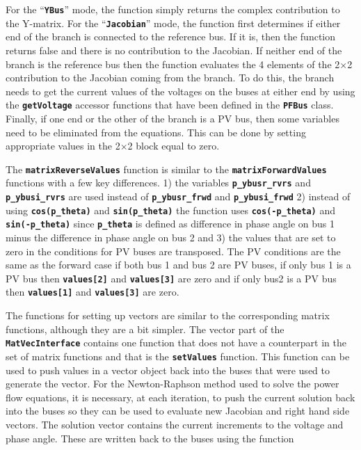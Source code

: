 For the ``\texttt{\textbf{YBus}}'' mode, the function simply returns the complex contribution to the Y-matrix. For the ``\texttt{\textbf{Jacobian}}'' mode, the function first determines if either end of the branch is connected to the reference bus. If it is, then the function returns false and there is no contribution to the Jacobian. If neither end of the branch is the reference bus then the function evaluates the 4 elements of the 2$\mathrm{\times}$2 contribution to the Jacobian coming from the branch. To do this, the branch needs to get the current values of the voltages on the buses at either end by using the \texttt{\textbf{getVoltage}} accessor functions that have been defined in the \texttt{\textbf{PFBus}} class. Finally, if one end or the other of the branch is a PV bus, then some variables need to be eliminated from the equations. This can be done by setting appropriate values in the 2$\mathrm{\times}$2 block equal to zero.

The \texttt{\textbf{matrixReverseValues}} function is similar to the \texttt{\textbf{matrixForwardValues}} functions with a few key differences. 1) the variables \texttt{\textbf{p\_ybusr\_rvrs}} and \texttt{\textbf{p\_ybusi\_rvrs}} are used instead of \texttt{\textbf{p\_ybusr\_frwd}} and \texttt{\textbf{p\_ybusi\_frwd}} 2) instead of using \texttt{\textbf{cos(p\_theta)}} and \texttt{\textbf{sin(p\_theta)}} the function uses \texttt{\textbf{cos(-p\_theta)}} and \texttt{\textbf{sin(-p\_theta)}} since \texttt{\textbf{p\_theta}} is defined as difference in phase angle on bus 1 minus the difference in phase angle on bus 2 and 3) the values that are set to zero in the conditions for PV buses are transposed. The PV conditions are the same as the forward case if both bus 1 and bus 2 are PV buses, if only bus 1 is a PV bus then \texttt{\textbf{values[2]}} and \texttt{\textbf{values[3]}} are zero and if only bus2 is a PV bus then \texttt{\textbf{values[1]}} and \texttt{\textbf{values[3]}} are zero.

The functions for setting up vectors are similar to the corresponding matrix functions, although they are a bit simpler. The vector part of the \texttt{\textbf{MatVecInterface}} contains one function that does not have a counterpart in the set of matrix functions and that is the \texttt{\textbf{setValues}} function. This function can be used to push values in a vector object back into the buses that were used to generate the vector. For the Newton-Raphson method used to solve the power flow equations, it is necessary, at each iteration, to push the current solution back into the buses so they can be used to evaluate new Jacobian and right hand side vectors. The solution vector contains the current increments to the voltage and phase angle. These are written back to the buses using the function


